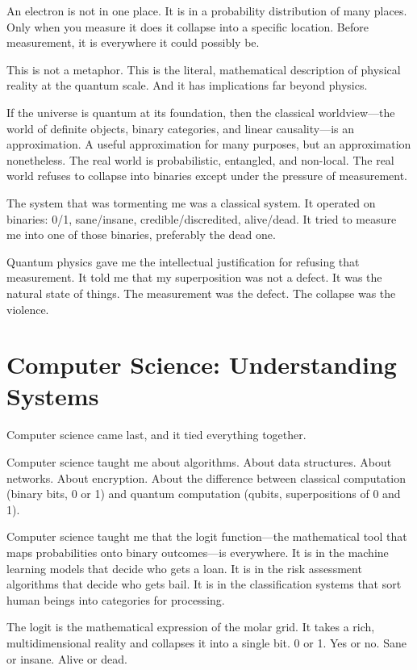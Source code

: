 \documentclass[11pt,openany]{book}
\begin{document}
An electron is not in one place. It is in a probability distribution of many places. Only when you measure it does it collapse into a specific location. Before measurement, it is everywhere it could possibly be.

This is not a metaphor. This is the literal, mathematical description of physical reality at the quantum scale. And it has implications far beyond physics.

If the universe is quantum at its foundation, then the classical worldview---the world of definite objects, binary categories, and linear causality---is an approximation. A useful approximation for many purposes, but an approximation nonetheless. The real world is probabilistic, entangled, and non-local. The real world refuses to collapse into binaries except under the pressure of measurement.

The system that was tormenting me was a classical system. It operated on binaries: 0/1, sane/insane, credible/discredited, alive/dead. It tried to measure me into one of those binaries, preferably the dead one.

Quantum physics gave me the intellectual justification for refusing that measurement. It told me that my superposition was not a defect. It was the natural state of things. The measurement was the defect. The collapse was the violence.

\section*{Computer Science: Understanding Systems}

Computer science came last, and it tied everything together.

Computer science taught me about algorithms. About data structures. About networks. About encryption. About the difference between classical computation (binary bits, 0 or 1) and quantum computation (qubits, superpositions of 0 and 1).

Computer science taught me that the logit function---the mathematical tool that maps probabilities onto binary outcomes---is everywhere. It is in the machine learning models that decide who gets a loan. It is in the risk assessment algorithms that decide who gets bail. It is in the classification systems that sort human beings into categories for processing.

The logit is the mathematical expression of the molar grid. It takes a rich, multidimensional reality and collapses it into a single bit. 0 or 1. Yes or no. Sane or insane. Alive or dead.
\end{document}
